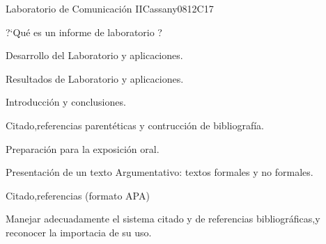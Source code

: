 \begin{syllabus}
\begin{outcomes}
   \item {}
   \item {}
\end{outcomes}

\begin{competences}
    \item {}
    \item {}
    \item {}
\end{competences}

\begin{unit}{Laboratorio de Comunicación II}{}{Cassany08}{12}{C17}
   \begin{topics}
      \item ?`Qué es un informe de laboratorio ?
      \item Desarrollo del Laboratorio y aplicaciones.
      \item Resultados de Laboratorio y aplicaciones.
      \item Introducción y conclusiones.
      \item Citado,referencias parentéticas y contrucción de bibliografía.
      \item Preparación para la exposición oral.
      \item Presentación de un texto Argumentativo: textos formales y  no formales.
      \item Citado,referencias (formato APA)
      
   \end{topics}
\begin{learningoutcomes}
      \item Manejar adecuadamente el sistema citado y de referencias bibliográficas,y reconocer la importacia de su uso.
   \end{learningoutcomes}
\end{unit}



\begin{coursebibliography}
\end{coursebibliography}

\end{syllabus}
